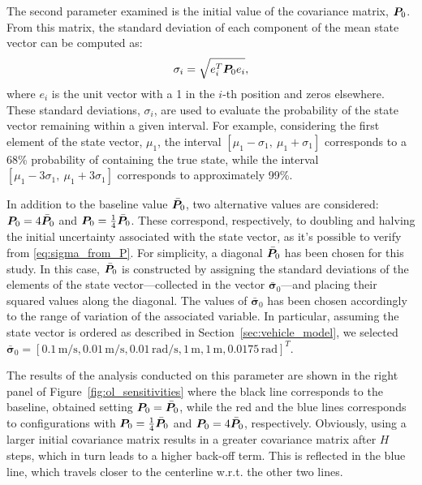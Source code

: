 The second parameter examined is the initial value of the covariance matrix, $\boldsymbol{P}_0$. From this matrix, the standard deviation of each component of the mean state vector can be computed as:
\begin{equation}
	\sigma_i = \sqrt{e_i^T \bP_0 e_i},\label{eq:sigma_from_P}
\end{equation}
where $e_i$ is the unit vector with a 1 in the $i$-th position and zeros elsewhere. These standard deviations, $\sigma_i$, are used to evaluate the probability of the state vector remaining within a given interval. For example, considering the first element of the state vector, $\mu_1$, the interval $\left[\mu_1 - \sigma_1,\ \mu_1 + \sigma_1\right]$ corresponds to a 68\% probability of containing the true state, while the interval $\left[\mu_1 - 3\sigma_1,\ \mu_1 + 3\sigma_1\right]$ corresponds to approximately 99\%.

In addition to the baseline value $\bar{\boldsymbol{P}}_0$, two alternative values are considered: $\boldsymbol{P}_0 = 4\bar{\boldsymbol{P}}_0$ and $\boldsymbol{P}_0 = \frac{1}{4}\bar{\boldsymbol{P}}_0$. These correspond, respectively, to doubling and halving the initial uncertainty associated with the state vector, as it's possible to verify from \eqref{eq:sigma_from_P}. 
For simplicity, a diagonal $\bar{\boldsymbol{P}}_0$ has been chosen for this study. In this case, $\bar{\boldsymbol{P}}_0$ is constructed by assigning the standard deviations of the elements of the state vector---collected in the vector $\bar{\boldsymbol{\sigma}}_0$---and placing their squared values along the diagonal. 
The values of $\bar{\boldsymbol{\sigma}}_0$ has been chosen accordingly to the range of variation of the associated variable. In particular, assuming the state vector is ordered as described in Section~\ref{sec:vehicle_model}, we selected $\bar{\boldsymbol{\sigma}}_0 = \left[0.1\,\textrm{m/s}, 0.01\,\textrm{m/s}, 0.01\,\textrm{rad/s}, 1\,\textrm{m}, 1\,\textrm{m}, 0.0175\,\textrm{rad}\right]^T$.

The results of the analysis conducted on this parameter are shown in the right panel of Figure~\ref{fig:ol_sensitivities} where the black line corresponds to the baseline, obtained setting $\boldsymbol{P}_0 = \bar{\boldsymbol{P}}_0$, while the red and the blue lines corresponds to configurations with $\boldsymbol{P}_0 = \frac{1}{4}\bar{\boldsymbol{P}}_0$ and $\boldsymbol{P}_0 = 4\bar{\boldsymbol{P}}_0$, respectively. 
Obviously, using a larger initial covariance matrix results in a greater covariance matrix after $H$ steps, which in turn leads to a higher back-off term. This is reflected in the blue line, which travels closer to the centerline w.r.t. the other two lines.

